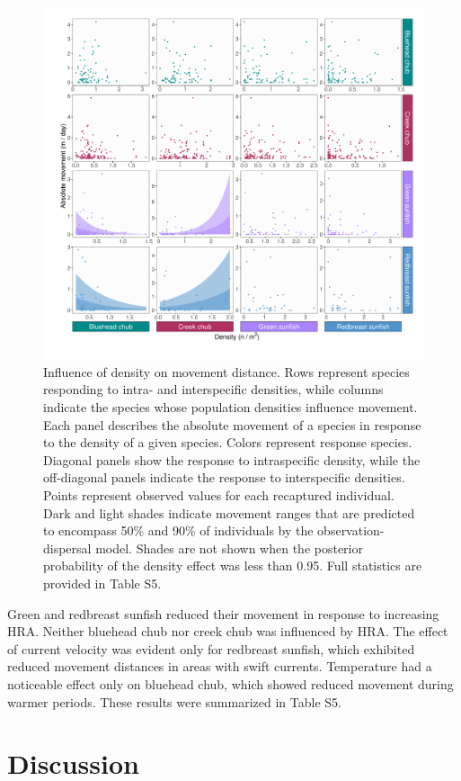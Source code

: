 \documentclass[11pt, class=article, crop=false]{standalone}
\begin{document}
\begin{figure}
    \centering
    \includegraphics[width=0.8\linewidth]{output/fig_density.pdf}
    \caption{Influence of density on movement distance. Rows represent species responding to intra- and interspecific densities, while columns indicate the species whose population densities influence movement. Each panel describes the absolute movement of a species in response to the density of a given species. Colors represent response species. Diagonal panels show the response to intraspecific density, while the off-diagonal panels indicate the response to interspecific densities. Points represent observed values for each recaptured individual. Dark and light shades indicate movement ranges that are predicted to encompass 50\% and 90\% of individuals by the observation-dispersal model. Shades are not shown when the posterior probability of the density effect was less than 0.95. Full statistics are provided in Table S5.}
    \label{fig:fig_density}
\end{figure}

Green and redbreast sunfish reduced their movement in response to increasing HRA. Neither bluehead chub nor creek chub was influenced by HRA. The effect of current velocity was evident only for redbreast sunfish, which exhibited reduced movement distances in areas with swift currents. Temperature had a noticeable effect only on bluehead chub, which showed reduced movement during warmer periods. These results were summarized in  Table S5.

\section{Discussion}
\end{document}
